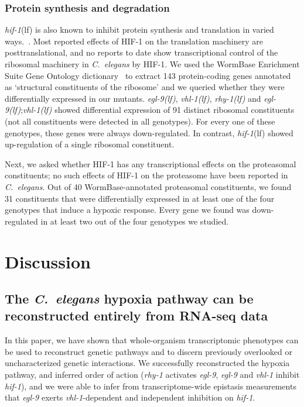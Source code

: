 \documentclass[10pt, onecolumn]{article}
\newcommand{\cel}{\emph{C.~elegans}}
\newcommand{\gene}[1]{\emph{#1}}
\newcommand{\egl}{\emph{\mbox{egl-9}(lf)}}
\newcommand{\rhy}{\emph{\mbox{rhy-1}(lf)}}
\newcommand{\vhl}{\emph{\mbox{vhl-1}(lf)}}
\newcommand{\hif}{\emph{\mbox{hif-1}}(lf)}
\newcommand{\hifp}{HIF-1}
\begin{document}
\subsubsection*{Protein synthesis and degradation}
\hif{} is also known to inhibit protein synthesis and translation in varied
ways.~\cite{Brugarolas2004}. Most reported effects of
\hifp{} on the translation machinery are posttranslational, and no reports to date
show transcriptional control of the ribosomal machinery in \cel{} by \hifp{}. We
used the WormBase Enrichment Suite Gene Ontology
dictionary~\cite{Angeles-Albores2016b} to extract 143 protein-coding genes
annotated as `structural constituents of the ribosome' and we queried whether
they were differentially expressed in our mutants. \egl{}, \vhl{}, \rhy{} and
\egl{};\vhl{} showed differential expression of 91 distinct ribosomal constituents
(not all constituents were detected in all genotypes). For every one of these
genotypes, these genes were always down-regulated. In contrast, \hif{} showed
up-regulation of a single ribosomal constituent.

Next, we asked whether \hifp{} has any transcriptional effects on the
proteasomal constituents; no such effects of \hifp{} on the proteasome
have been reported in \cel{}. Out of 40 WormBase-annotated proteasomal constituents,
we found 31 constituents that were differentially expressed in at least one of the
four genotypes that induce a hypoxic response. Every gene we found was down-regulated
in at least two out of the four genotypes we studied.

\section*{Discussion}
\subsection*{The \cel{} hypoxia pathway can be reconstructed entirely from
             RNA-seq data}
In this paper, we have shown that whole-organism transcriptomic phenotypes
can be used to reconstruct genetic pathways and to discern previously overlooked
or uncharacterized genetic interactions. We successfully reconstructed the hypoxia
pathway, and inferred order of action (\gene{rhy-1} activates \gene{egl-9},
\gene{egl-9} and \gene{vhl-1} inhibit \gene{hif-1}), and we were able to infer
from transcriptome-wide epistasis measurements that \gene{egl-9} exerts
\gene{vhl-1}-dependent and independent inhibition on \gene{hif-1}.
\end{document}
